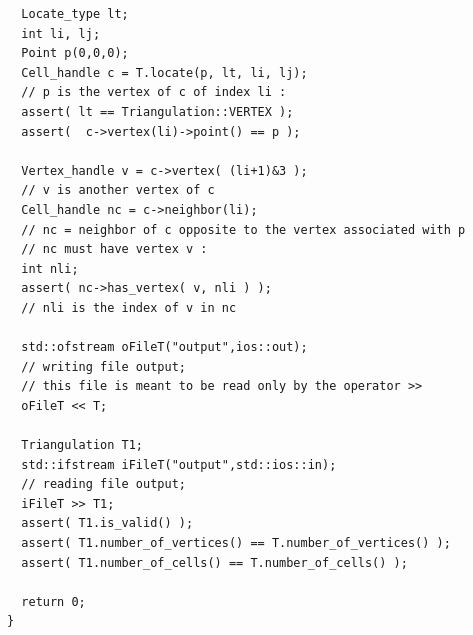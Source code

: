 \begin{verbatim}
  Locate_type lt;
  int li, lj;
  Point p(0,0,0);
  Cell_handle c = T.locate(p, lt, li, lj);
  // p is the vertex of c of index li :
  assert( lt == Triangulation::VERTEX );
  assert(  c->vertex(li)->point() == p );

  Vertex_handle v = c->vertex( (li+1)&3 );
  // v is another vertex of c
  Cell_handle nc = c->neighbor(li);
  // nc = neighbor of c opposite to the vertex associated with p
  // nc must have vertex v :
  int nli;
  assert( nc->has_vertex( v, nli ) );
  // nli is the index of v in nc

  std::ofstream oFileT("output",ios::out);
  // writing file output; 
  // this file is meant to be read only by the operator >>
  oFileT << T; 

  Triangulation T1;
  std::ifstream iFileT("output",std::ios::in);
  // reading file output; 
  iFileT >> T1; 
  assert( T1.is_valid() );
  assert( T1.number_of_vertices() == T.number_of_vertices() );
  assert( T1.number_of_cells() == T.number_of_cells() );

  return 0;
}
\end{verbatim}


